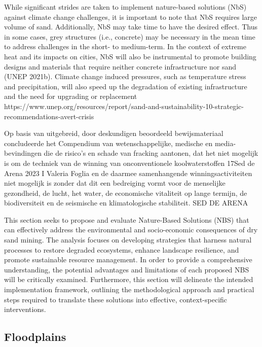 
While significant strides are taken to implement
nature-based solutions (NbS) against climate change
challenges, it is important to note that NbS requires large
volume of sand. Additionally, NbS may take time to have
the desired effect. Thus in some cases, grey structures
(i.e., concrete) may be necessary in the mean time to
address challenges in the short- to medium-term. In the
context of extreme heat and its impacts on cities, NbS
will also be instrumental to promote building designs and
materials that require neither concrete infrastructure nor
sand (UNEP 2021b). Climate change induced pressures,
such as temperature stress and precipitation, will also
speed up the degradation of existing infrastructure and
the need for upgrading or replacement
https://www.unep.org/resources/report/sand-and-sustainability-10-strategic-recommendations-avert-crisis

Op basis van uitgebreid, door deskundigen beoordeeld bewijsmateriaal concludeerde het Compendium van wetenschappelijke, medische en media-bevindingen die de risico's en schade van fracking aantonen, dat het niet mogelijk is om de techniek van de winning van onconventionele koolwaterstoffen 17Sed de Arena 2023 I Valeria Foglia en de daarmee samenhangende winningsactiviteiten niet mogelijk is zonder dat dit een bedreiging vormt voor de menselijke gezondheid, de lucht, het water, de economische vitaliteit op lange termijn, de biodiversiteit en de seismische en klimatologische stabiliteit. SED DE ARENA

This section seeks to propose and evaluate Nature-Based Solutions (NBS) that can effectively address the environmental and socio-economic consequences of dry sand mining. The analysis focuses on developing strategies that harness natural processes to restore degraded ecosystems, enhance landscape resilience, and promote sustainable resource management. In order to provide a comprehensive understanding, the potential advantages and limitations of each proposed NBS will be critically examined. Furthermore, this section will delineate the intended implementation framework, outlining the methodological approach and practical steps required to translate these solutions into effective, context-specific interventions.

\subsection{Floodplains}

